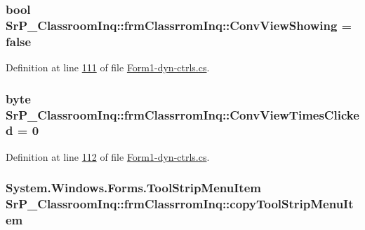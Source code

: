 \hypertarget{class_sr_p___classroom_inq_1_1frm_classrrom_inq_a5b2fbbaa361339e096aa4be3f8e2b2dd}{
\subsubsection[{\-Conv\-View\-Showing}]{\setlength{\rightskip}{0pt plus 5cm}bool {\bf \-Sr\-P\-\_\-\-Classroom\-Inq\-::frm\-Classrrom\-Inq\-::\-Conv\-View\-Showing} = false}}
\label{class_sr_p___classroom_inq_1_1frm_classrrom_inq_a5b2fbbaa361339e096aa4be3f8e2b2dd}


\-Definition at line \hyperlink{_form1-dyn-ctrls_8cs_source_l00111}{111} of file \hyperlink{_form1-dyn-ctrls_8cs_source}{\-Form1-\/dyn-\/ctrls.\-cs}.

\hypertarget{class_sr_p___classroom_inq_1_1frm_classrrom_inq_a8b7285b1ee1626d8ebdc99d4bd6046a8}{
\subsubsection[{\-Conv\-View\-Times\-Clicked}]{\setlength{\rightskip}{0pt plus 5cm}byte {\bf \-Sr\-P\-\_\-\-Classroom\-Inq\-::frm\-Classrrom\-Inq\-::\-Conv\-View\-Times\-Clicked} = 0}}
\label{class_sr_p___classroom_inq_1_1frm_classrrom_inq_a8b7285b1ee1626d8ebdc99d4bd6046a8}


\-Definition at line \hyperlink{_form1-dyn-ctrls_8cs_source_l00112}{112} of file \hyperlink{_form1-dyn-ctrls_8cs_source}{\-Form1-\/dyn-\/ctrls.\-cs}.

\hypertarget{class_sr_p___classroom_inq_1_1frm_classrrom_inq_a945826606f8dc78bfaaa45591619ecfc}{
\subsubsection[{copy\-Tool\-Strip\-Menu\-Item}]{\setlength{\rightskip}{0pt plus 5cm}\-System.\-Windows.\-Forms.\-Tool\-Strip\-Menu\-Item {\bf \-Sr\-P\-\_\-\-Classroom\-Inq\-::frm\-Classrrom\-Inq\-::copy\-Tool\-Strip\-Menu\-Item}}}
\label{class_sr_p___classroom_inq_1_1frm_classrrom_inq_a945826606f8dc78bfaaa45591619ecfc}


